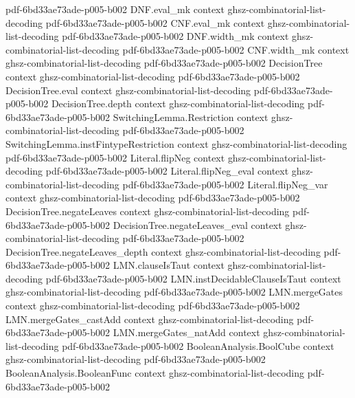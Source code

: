\begin{lemma}
  {pdf-6bd33ae73ade-p005-b002}
\proofstep
  {DNF.eval_mk}
  {context}
  {ghsz-combinatorial-list-decoding}
  {pdf-6bd33ae73ade-p005-b002}
\proofstep
  {CNF.eval_mk}
  {context}
  {ghsz-combinatorial-list-decoding}
  {pdf-6bd33ae73ade-p005-b002}
\proofstep
  {DNF.width_mk}
  {context}
  {ghsz-combinatorial-list-decoding}
  {pdf-6bd33ae73ade-p005-b002}
\proofstep
  {CNF.width_mk}
  {context}
  {ghsz-combinatorial-list-decoding}
  {pdf-6bd33ae73ade-p005-b002}
\proofstep
  {DecisionTree}
  {context}
  {ghsz-combinatorial-list-decoding}
  {pdf-6bd33ae73ade-p005-b002}
\proofstep
  {DecisionTree.eval}
  {context}
  {ghsz-combinatorial-list-decoding}
  {pdf-6bd33ae73ade-p005-b002}
\proofstep
  {DecisionTree.depth}
  {context}
  {ghsz-combinatorial-list-decoding}
  {pdf-6bd33ae73ade-p005-b002}
\proofstep
  {SwitchingLemma.Restriction}
  {context}
  {ghsz-combinatorial-list-decoding}
  {pdf-6bd33ae73ade-p005-b002}
\proofstep
  {SwitchingLemma.instFintypeRestriction}
  {context}
  {ghsz-combinatorial-list-decoding}
  {pdf-6bd33ae73ade-p005-b002}
\proofstep
  {Literal.flipNeg}
  {context}
  {ghsz-combinatorial-list-decoding}
  {pdf-6bd33ae73ade-p005-b002}
\proofstep
  {Literal.flipNeg_eval}
  {context}
  {ghsz-combinatorial-list-decoding}
  {pdf-6bd33ae73ade-p005-b002}
\proofstep
  {Literal.flipNeg_var}
  {context}
  {ghsz-combinatorial-list-decoding}
  {pdf-6bd33ae73ade-p005-b002}
\proofstep
  {DecisionTree.negateLeaves}
  {context}
  {ghsz-combinatorial-list-decoding}
  {pdf-6bd33ae73ade-p005-b002}
\proofstep
  {DecisionTree.negateLeaves_eval}
  {context}
  {ghsz-combinatorial-list-decoding}
  {pdf-6bd33ae73ade-p005-b002}
\proofstep
  {DecisionTree.negateLeaves_depth}
  {context}
  {ghsz-combinatorial-list-decoding}
  {pdf-6bd33ae73ade-p005-b002}
\proofstep
  {LMN.clauseIsTaut}
  {context}
  {ghsz-combinatorial-list-decoding}
  {pdf-6bd33ae73ade-p005-b002}
\proofstep
  {LMN.instDecidableClauseIsTaut}
  {context}
  {ghsz-combinatorial-list-decoding}
  {pdf-6bd33ae73ade-p005-b002}
\proofstep
  {LMN.mergeGates}
  {context}
  {ghsz-combinatorial-list-decoding}
  {pdf-6bd33ae73ade-p005-b002}
\proofstep
  {LMN.mergeGates_castAdd}
  {context}
  {ghsz-combinatorial-list-decoding}
  {pdf-6bd33ae73ade-p005-b002}
\proofstep
  {LMN.mergeGates_natAdd}
  {context}
  {ghsz-combinatorial-list-decoding}
  {pdf-6bd33ae73ade-p005-b002}
\proofstep
  {BooleanAnalysis.BoolCube}
  {context}
  {ghsz-combinatorial-list-decoding}
  {pdf-6bd33ae73ade-p005-b002}
\proofstep
  {BooleanAnalysis.BooleanFunc}
  {context}
  {ghsz-combinatorial-list-decoding}
  {pdf-6bd33ae73ade-p005-b002}
\proofstep

\end{lemma}
